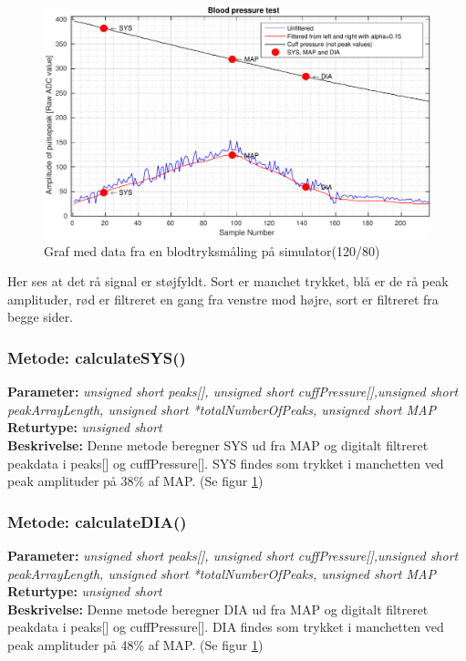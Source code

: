 \newpage
\begin{figure}[H]
	\includegraphics[width=\textwidth]{billeder/Alpha015-crop.pdf}
	\caption{Graf med data fra en blodtryksmåling på simulator(120/80)}\label{fig:bpMeasurement}
\end{figure}
Her ses at det rå signal er støjfyldt. Sort er manchet trykket, blå er de rå peak amplituder, rød er filtreret en gang fra venstre mod højre, sort	er filtreret fra begge sider.

\subsubsection{Metode: calculateSYS()}
\textbf{Parameter: } \textit{unsigned short peaks[], unsigned short cuffPressure[],unsigned short peakArrayLength, unsigned short *totalNumberOfPeaks, unsigned short MAP}
\\ \textbf{Returtype: } \textit{unsigned short}
\\ \textbf{Beskrivelse: } Denne metode beregner SYS ud fra MAP og digitalt filtreret peakdata i peaks[] og cuffPressure[]. SYS findes som trykket i manchetten ved peak amplituder på 38\% af MAP. (Se figur \ref{fig:bpMeasurement})

\subsubsection{Metode: calculateDIA()}
\textbf{Parameter: } \textit{unsigned short peaks[], unsigned short cuffPressure[],unsigned short peakArrayLength, unsigned short *totalNumberOfPeaks, unsigned short MAP}
\\ \textbf{Returtype: } \textit{unsigned short}
\\ \textbf{Beskrivelse: } Denne metode beregner DIA ud fra MAP og digitalt filtreret peakdata i peaks[] og cuffPressure[]. DIA findes som trykket i manchetten ved peak amplituder på 48\% af MAP. (Se figur \ref{fig:bpMeasurement})

